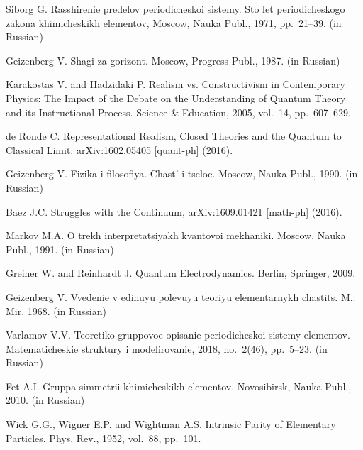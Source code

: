 {\protect\footnotesize {}\begin{thebibliography}{99}

 Siborg G. Rasshirenie predelov periodicheskoi sistemy. Sto let periodicheskogo zakona khimicheskikh elementov, Moscow, Nauka Publ., 1971, pp.~21--39.
(in Russian)
 
 Geizenberg V. Shagi za gorizont. Moscow, Progress Publ., 1987.
%
 (in Russian)
 
 Karakostas V. and Hadzidaki P. Realism vs. Constructivism in Contemporary Physics: The Impact of the Debate on the Understanding of Quantum Theory and its Instructional Process. Science \& Education, 2005, vol.~14, pp.~607--629.
%

 de Ronde C. Representational Realism, Closed Theories and the Quantum to Classical Limit. arXiv:1602.05405 [quant-ph] (2016).
%

 Geizenberg V. Fizika i filosofiya. Chast' i tseloe. Moscow, Nauka Publ., 1990.
%
 (in Russian)
 
 Baez J.C. Struggles with the Continuum, arXiv:1609.01421 [math-ph] (2016).
%

 Markov M.A. O trekh interpretatsiyakh kvantovoi mekhaniki. Moscow, Nauka Publ., 1991.
%
 (in Russian)
 
 Greiner W. and Reinhardt J. Quantum Electrodynamics. Berlin, Springer, 2009.
%

 Geizenberg V. Vvedenie v edinuyu polevuyu teoriyu elementarnykh chastits. M.: Mir, 1968.
%
 (in Russian)
 
  Varlamov V.V. Teoretiko-gruppovoe opisanie periodicheskoi sistemy elementov.
Matematicheskie struktury i modelirovanie, 2018, no.~2(46), pp.~5--23.
%
 (in Russian)
 
 Fet A.I. Gruppa simmetrii khimicheskikh elementov. Novosibirsk, Nauka Publ., 2010.
%
 (in Russian)
 
 Wick G.G., Wigner E.P. and Wightman A.S. Intrinsic Parity of Elementary Particles. Phys. Rev., 1952, vol.~88, pp.~101.

\end{thebibliography}
}

\endarticle

